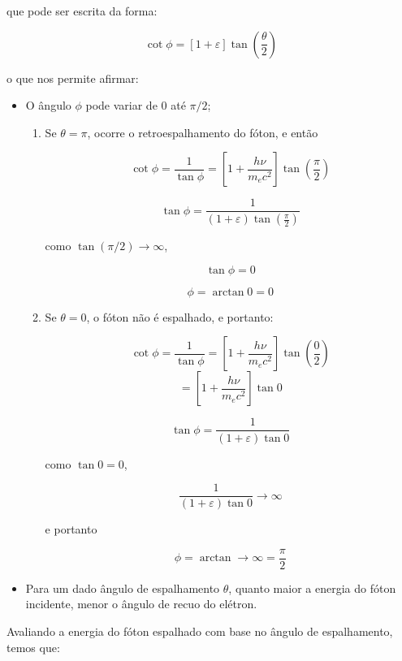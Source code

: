 \documentclass[11pt,a4paper]{article}
\begin{document}
    \noindent que pode ser escrita da forma:

                \begin{equation}
                    \cot \phi = \left[1 + \varepsilon  \right]\tan \left(\frac{\theta}{2}\right)
                \end{equation}

    \noindent o que nos permite afirmar:

    \begin{itemize}
		\item  O ângulo $\phi$ pode variar de 0 até $\pi/2$;
			\begin{enumerate}
				\item Se $\theta = \pi$, ocorre o retroespalhamento do fóton, e então 
				
					$$\cot \phi = \frac{1}{\tan \phi} =  \left[1 + \frac{h\nu}{m_ec^2} \right]\tan \left(\frac{\pi}{2}\right) $$

					$$\tan \phi = \frac{1}{(1 + \varepsilon ) \tan \left(\frac{\pi}{2}\right)}$$

					\noindent como $\tan (\pi/2) \rightarrow \infty$,

					$$\tan \phi = 0$$

					$$\phi = \arctan 0 = 0$$

				\item Se $\theta = 0$, o fóton não é espalhado, e portanto:
				
				$$\cot \phi = \frac{1}{\tan \phi} =  \left[1 + \frac{h\nu}{m_ec^2} \right]\tan \left(\frac{0}{2}\right) $$
				$$=  \left[1 + \frac{h\nu}{m_ec^2} \right]\tan 0 $$

				$$\tan \phi = \frac{1}{(1 + \varepsilon ) \tan 0}$$

				\noindent como $\tan 0 = 0$, 

				$$\frac{1}{(1 + \varepsilon ) \tan 0} \rightarrow \infty $$

				\noindent e portanto 

				$$\phi = \arctan \rightarrow \infty = \frac{\pi}{2} $$

			\end{enumerate}
		\item Para um dado ângulo de espalhamento $\theta$, quanto maior a energia do fóton incidente, menor o ângulo de recuo do elétron.
	\end{itemize}

    \noindent Avaliando a energia do fóton espalhado com base no ângulo de espalhamento, temos que:
\end{document}
